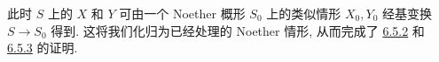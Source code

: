 此时 \(S\) 上的 \(X\) 和 \(Y\) 可由一个
Noether 概形 \(S_0\) 上的类似情形 \(X_0,Y_0\)
经基变换 \(S\to S_0\) 得到. 这将我们化归为已经处理的
Noether 情形, 从而完成了
\hyperref[thm:sga3-VIB-6.5.2]{6.5.2} 和
\hyperref[cor:sga3-VIB-6.5.3]{6.5.3} 的证明.


